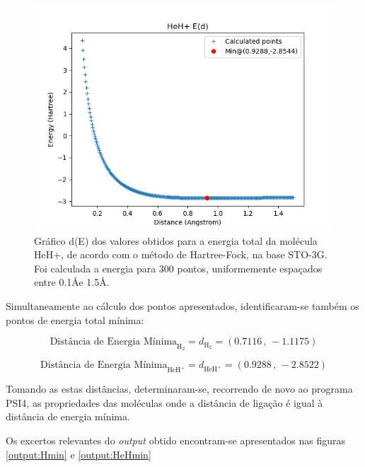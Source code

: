 \documentclass[portuguese,]{article}
\begin{document}
\begin{figure}
\centering
\includegraphics{bits/figures/ex2-HeH.png}
\caption{Gráfico d(E) dos valores obtidos para a energia total da
molécula HeH+, de acordo com o método de Hartree-Fock, na base STO-3G.
Foi calculada a energia para 300 pontos, uniformemente espaçados entre
0.1\AA e 1.5\AA. \label{fig:varHeH}}
\end{figure}

Simultaneamente ao cálculo dos pontos apresentados, identificaram-se
também os pontos de energia total mínima:

\[ \text{Distância de Energia Mínima}_{\text{H}_2}   = d_{\text{H}_2}   = \left ( 0.7116 \, , \, -1.1175 \right ) \]

\[ \text{Distância de Energia Mínima}_{\text{HeH}^+} = d_{\text{HeH}^+} = \left ( 0.9288 \, , \, -2.8522 \right ) \]

Tomando as estas distâncias, determinaram-se, recorrendo de novo ao
programa PSI4, as propriedades das moléculas onde a distância de ligação
é igual à distância de energia mínima.

Os excertos relevantes do \emph{output} obtido encontram-se apresentados
nas figuras \ref{output:Hmin} e \ref{output:HeHmin}
\end{document}
